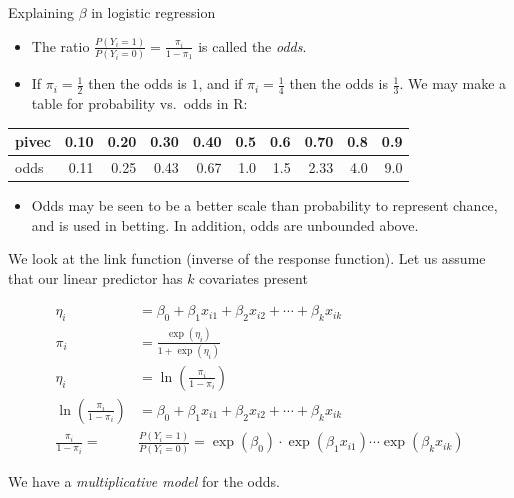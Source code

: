\documentclass[
  ignorenonframetext,
]{beamer}
\providecommand{\tightlist}{%
  \setlength{\itemsep}{0pt}\setlength{\parskip}{0pt}}
\begin{document}
\begin{frame}

\begin{block}{Explaining \(\beta\) in logistic regression}

\begin{itemize}
\item
  The ratio \(\frac{P(Y_i=1)}{P(Y_i=0)}=\frac{\pi_i}{1-\pi_1}\) is
  called the \emph{odds}.
\item
  If \(\pi_i=\frac{1}{2}\) then the odds is \(1\), and if
  \(\pi_i=\frac{1}{4}\) then the odds is \(\frac{1}{3}\). We may make a
  table for probability vs.~odds in R:
\end{itemize}

\begin{table}[H]
\centering
\begin{tabular}{l|r|r|r|r|r|r|r|r|r}
\hline
pivec & 0.10 & 0.20 & 0.30 & 0.40 & 0.5 & 0.6 & 0.70 & 0.8 & 0.9\\
\hline
odds & 0.11 & 0.25 & 0.43 & 0.67 & 1.0 & 1.5 & 2.33 & 4.0 & 9.0\\
\hline
\end{tabular}
\end{table}

\begin{itemize}
\tightlist
\item
  Odds may be seen to be a better scale than probability to represent
  chance, and is used in betting. In addition, odds are unbounded above.
\end{itemize}

\end{block}

\end{frame}

\begin{frame}

We look at the link function (inverse of the response function). Let us
assume that our linear predictor has \(k\) covariates present

\begin{align*}
\eta_i&= \beta_0+\beta_1 x_{i1}+\beta_2 x_{i2}+\cdots + \beta_k x_{ik}\\
\pi_i&= \frac{\exp(\eta_i)}{1+\exp(\eta_i)}\\
\eta_i&=\ln(\frac{\pi_i}{1-\pi_i})\\
\ln(\frac{\pi_i}{1-\pi_i})&=\beta_0+\beta_1 x_{i1}+\beta_2 x_{i2}+\cdots + \beta_k x_{ik}\\
\frac{\pi_i}{1-\pi_i}=&\frac{P(Y_i=1)}{P(Y_i=0)}=\exp(\beta_0)\cdot \exp(\beta_1 x_{i1})\cdots\exp(\beta_k x_{ik})
\end{align*}

We have a \emph{multiplicative model} for the odds.

\end{frame}
\end{document}
